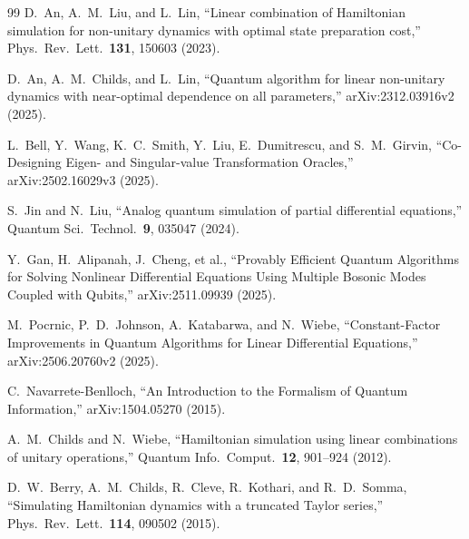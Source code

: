 \documentclass[11pt]{article}
\begin{document}
\begin{thebibliography}{99}
D.~An, A.~M.~Liu, and L.~Lin,
``Linear combination of Hamiltonian simulation for non-unitary dynamics
with optimal state preparation cost,''
Phys.\ Rev.\ Lett.\ \textbf{131}, 150603 (2023).

D.~An, A.~M.~Childs, and L.~Lin,
``Quantum algorithm for linear non-unitary dynamics with near-optimal
dependence on all parameters,''
arXiv:2312.03916v2 (2025).

L.~Bell, Y.~Wang, K.~C.~Smith, Y.~Liu, E.~Dumitrescu, and S.~M.~Girvin,
``Co-Designing Eigen- and Singular-value Transformation Oracles,''
arXiv:2502.16029v3 (2025).

S.~Jin and N.~Liu,
``Analog quantum simulation of partial differential equations,''
Quantum Sci.\ Technol.\ \textbf{9}, 035047 (2024).

Y.~Gan, H.~Alipanah, J.~Cheng, et al.,
``Provably Efficient Quantum Algorithms for Solving Nonlinear
Differential Equations Using Multiple Bosonic Modes Coupled with Qubits,''
arXiv:2511.09939 (2025).

M.~Pocrnic, P.~D.~Johnson, A.~Katabarwa, and N.~Wiebe,
``Constant-Factor Improvements in Quantum Algorithms for Linear
Differential Equations,''
arXiv:2506.20760v2 (2025).

C.~Navarrete-Benlloch,
``An Introduction to the Formalism of Quantum Information,''
arXiv:1504.05270 (2015).

A.~M.~Childs and N.~Wiebe,
``Hamiltonian simulation using linear combinations of unitary operations,''
Quantum Info.\ Comput.\ \textbf{12}, 901--924 (2012).

D.~W.~Berry, A.~M.~Childs, R.~Cleve, R.~Kothari, and R.~D.~Somma,
``Simulating Hamiltonian dynamics with a truncated Taylor series,''
Phys.\ Rev.\ Lett.\ \textbf{114}, 090502 (2015).
\end{thebibliography}
\end{document}
